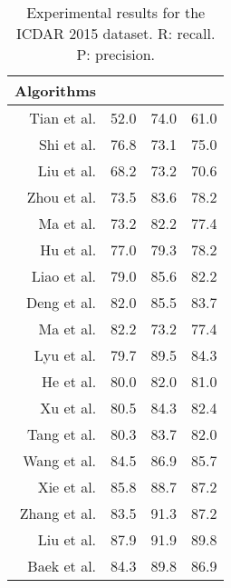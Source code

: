 \begin{table}[!t]
    \caption{Experimental results for the ICDAR 2015 dataset. R: recall. P: precision. }
    \label{tab:ic15}
    \centering
    \newcommand{\tabincell}[2]{\begin{tabular}{@{}#1@{}}#2\end{tabular}}
    \small
\begin{tabular}{ r  |ccc}
      \hline
      Algorithms  &   &  &  \\
      \hline
      \hline
      Tian et al. \cite{tian2016detecting} & 52.0 & 74.0 & 61.0 \\
      \hline
      Shi et al. \cite{shi2017detecting} & 76.8  & 73.1 & 75.0\\
      \hline
      Liu et al. \cite{liu2017deep} & 68.2 & 73.2 & 70.6\\
      \hline
      Zhou et al. \cite{zhou2017east}  & 73.5 & 83.6 & 78.2\\
      \hline
      Ma et al. \cite{ma2018arbitrary}  & 73.2 & 82.2 & 77.4\\
      \hline
      Hu et al. \cite{hu2017wordsup} & 77.0 & 79.3 & 78.2\\
      \hline
      Liao et al. \cite{liao2018rotation} & 79.0 & 85.6 & 82.2\\
      \hline
      Deng et al. \cite{deng2018pixellink} & 82.0 & 85.5 & 83.7\\
      \hline
      Ma et al. \cite{ma2018arbitrary} & 82.2 & 73.2 & 77.4\\
      \hline
      Lyu et al. \cite{lyu2018multi} & 79.7 & 89.5 & 84.3\\
      \hline
      He et al. \cite{he2017deep} & 80.0 & 82.0 & 81.0 \\
      \hline
      Xu et al. \cite{xu2019textfield} & 80.5 & 84.3 & 82.4  \\
      \hline
      Tang et al. \cite{tang2019detecting} & 80.3 & 83.7 & 82.0  \\
      \hline
      Wang et al. \cite{wang2019shape} & 84.5 & 86.9 & 85.7 \\
      \hline
      Xie et al. \cite{xie2018scene} & 85.8 & 88.7 & 87.2 \\
      \hline
      Zhang et al. \cite{zhang2019look} & 83.5 & 91.3 & 87.2  \\
      \hline
      Liu et al. \cite{liu2018fots} & 87.9 & 91.9 & 89.8 \\
      \hline
      Baek et al. \cite{baek2019character} & 84.3 & 89.8 & 86.9 \\
      \hline

\end{tabular}
\end{table}

